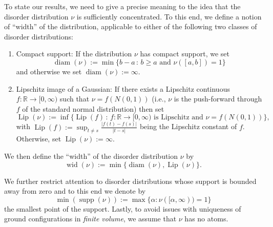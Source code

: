 \documentclass[11pt, reqno]{amsart}
\newcommand{\R}{\mathbb{R}}
\DeclareMathOperator{\supp}{supp}
\DeclareMathOperator{\lip}{Lip}
\DeclareMathOperator{\diam}{diam}
\DeclareMathOperator{\wid}{wid}
\numberwithin{equation}{section}
\begin{document}
\smallskip
{} To state our results, we need to give a precise meaning to the idea that the disorder distribution $\nu$ is sufficiently concentrated. To this end, we define a notion of ``width'' of the  distribution, applicable to either of the following two classes of disorder distributions:
\begin{enumerate}
\item 
Compact support: If the distribution $\nu$ has compact support, we set 
\begin{equation}
\diam(\nu):=\min\{b-a\,\colon\, b\ge a\text{ and } \nu([a,b])=1\}
\end{equation}
and otherwise we set $\diam(\nu):=\infty$.
\item 
Lipschitz image of a Gaussian: If there exists a Lipschitz continuous $f:\R\to[0,\infty)$ such that $\nu=f(N(0,1))$ (i.e., $\nu$ is the push-forward through $f$ of the standard normal distribution) then set
\begin{equation}\label{eq:lip_const_of_distribution}
\lip(\nu):=\inf\{\lip(f)\,\colon\, f:\R\to[0,\infty) \text{ is Lipschitz and }\nu=f(N(0,1))\},
\end{equation}
with $\lip(f):=\sup_{t\neq s}\frac{|f(t)-f(s)|}{|t-s|}$ being the Lipschitz constant of $f$. Otherwise, set $\lip(\nu):=\infty$.
\end{enumerate}
We then define the ``width'' of the disorder distribution $\nu$ by
\begin{equation}\label{eq:width dist def}
\wid(\nu):=\min\{\diam(\nu),\lip(\nu)\}.
\end{equation}

We further restrict attention to disorder distributions whose support is bounded away from zero and to this end we denote by
\begin{equation}
\min(\supp(\nu)):=\max\{\alpha\colon \nu([\alpha,\infty))=1\}
\end{equation}
the smallest point of the support. Lastly, to avoid issues with uniqueness of ground configurations in \emph{finite volume}, we assume that $\nu$ has no atoms.
\end{document}
